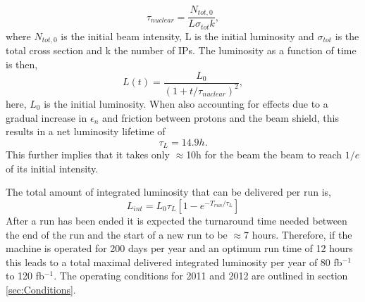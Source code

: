 \begin{equation}
\tau_{nuclear}=\frac{N_{tot,0}}{L\sigma_{tot}k},
\end{equation}
where $N_{tot,0}$ is the initial beam intensity, L is the initial
luminosity and $\sigma_{tot}$ is the total cross section and 
k the number of IPs.
The luminosity as a function of time is then,
\begin{equation}
L(t)=\frac{L_{0}}{(1+t/\tau_{nuclear})^{2}},
\end{equation}
here, $L_{0}$ is the initial luminosity.
When also accounting for effects due to a gradual increase in
 $\epsilon_{n}$ and friction between protons and the 
 beam shield, this results in a net luminosity lifetime of 
\begin{equation}
\tau_{L} = 14.9 h .
\end{equation}
This further implies that it takes only $\approx$10h for the
beam the beam to reach $1/e$ of its initial intensity.

The total amount of integrated luminosity that can be delivered
per run is,
\begin{equation}
L_{int}=L_{0}\tau_{L}\left[ 1-e^{-T_{run}/\tau_{L}}\right]
\end{equation}
After a run has been ended it is expected the turnaround time
needed between the end of the run and the start of a new run
to be $\approx$7 hours. Therefore, if the machine is operated for 200 days
per year and an optimum run time of 12 hours this leads to a 
total maximal delivered integrated luminosity per year of 80 fb$^{-1}$
to 120 fb$^{-1}$. The operating conditions for 2011 and 2012
are outlined in section \ref{sec:Conditions}.

